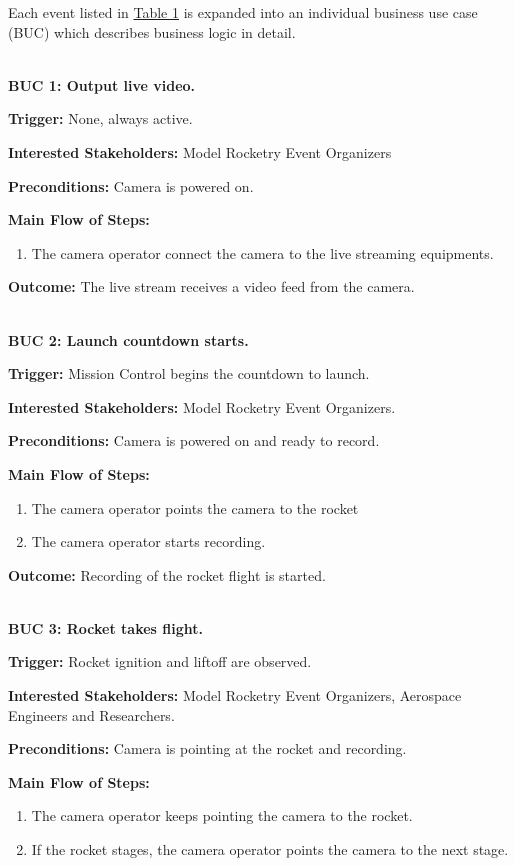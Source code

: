 \documentclass[12pt]{article}
\begin{document}
Each event listed in \hyperref[tab:work-part]{Table 1} is expanded into an
individual business use case (BUC) which describes business logic in detail.

~\\

\textbf{BUC 1: Output live video.}

\textbf{Trigger:} None, always active.

\textbf{Interested Stakeholders:} Model Rocketry Event Organizers

\textbf{Preconditions:} Camera is powered on.

\textbf{Main Flow of Steps:}
\begin{enumerate}
  \item The camera operator connect the camera to the live streaming equipments.
\end{enumerate}

\textbf{Outcome:} The live stream receives a video feed from the camera.

~\\

\textbf{BUC 2: Launch countdown starts.}

\textbf{Trigger:} Mission Control begins the countdown to launch.

\textbf{Interested Stakeholders:} Model Rocketry Event Organizers.

\textbf{Preconditions:} Camera is powered on and ready to record.

\textbf{Main Flow of Steps:}
\begin{enumerate}
  \item The camera operator points the camera to the rocket
  \item The camera operator starts recording.
\end{enumerate}

\textbf{Outcome:} Recording of the rocket flight is started.

~\\

\textbf{BUC 3: Rocket takes flight.}

\textbf{Trigger:} Rocket ignition and liftoff are observed.

\textbf{Interested Stakeholders:} Model Rocketry Event Organizers, Aerospace Engineers and Researchers.

\textbf{Preconditions:} Camera is pointing at the rocket and recording.

\textbf{Main Flow of Steps:}
\begin{enumerate}
  \item The camera operator keeps pointing the camera to the rocket.
  \item If the rocket stages, the camera operator points the camera to the next stage.
\end{enumerate}
\end{document}
